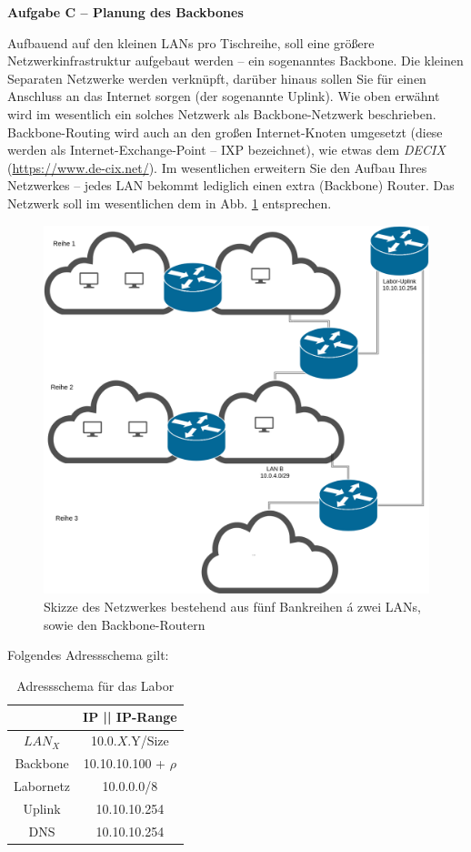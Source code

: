 \documentclass[paper=a4,fontsize=11pt]{scrartcl}%
\numberwithin{equation}{section}
\begin{document}
\begin{center}\Large{\textbf{Aufgabe C -- Planung des Backbones}}\end{center}\vskip0.25in
Aufbauend auf den kleinen LANs pro Tischreihe, soll eine größere Netzwerkinfrastruktur aufgebaut werden -- ein sogenanntes Backbone. Die kleinen Separaten Netzwerke werden verknüpft, darüber hinaus sollen Sie für einen Anschluss an das Internet sorgen (der sogenannte Uplink). Wie oben erwähnt wird im wesentlich ein solches Netzwerk als Backbone-Netzwerk beschrieben. Backbone-Routing wird auch an den großen Internet-Knoten umgesetzt (diese werden als Internet-Exchange-Point -- IXP bezeichnet), wie etwas dem \emph{DECIX} (\url{https://www.de-cix.net/}).
Im wesentlichen erweitern Sie den Aufbau Ihres Netzwerkes -- jedes LAN bekommt lediglich einen extra (Backbone) Router. Das Netzwerk soll im wesentlichen dem in Abb. \ref{backbone} entsprechen.
	\begin{figure}[H]
	\centering
	\includegraphics[scale=0.25]{backbone}
	\caption{Skizze des Netzwerkes bestehend aus fünf Bankreihen á zwei LANs, sowie den Backbone-Routern}
	\label{backbone}
	\end{figure}
Folgendes Adressschema gilt:
\begin{table}[H]
\caption{Adressschema für das Labor}
\label{adress_scheme}
\centering
\begin{tabular}{|c|c|}\hline
 & \textbf{IP  || IP-Range} \\ \hline
 $LAN_X$ & 10.0.$X$.Y/Size \\ \hline
 Backbone & 10.10.10.100 + $\rho$ \\ \hline
 Labornetz & 10.0.0.0/8 \\ \hline
 Uplink & 10.10.10.254 \\ \hline
 DNS & 10.10.10.254 \\ \hline
\end{tabular}
\end{table} 
\end{document}

